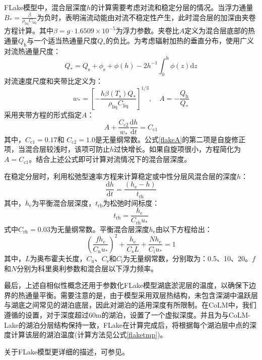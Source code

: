 FLake模型中，混合层深度$h$的计算需要考虑对流和稳定分层的情况。当浮力通量$B_* = \frac{\beta}{\rho_{\mathrm{liq}} C_{\mathrm{liq}}}$为负时，表明湍流动能由对流不稳定性产生，此时混合层的加深由夹卷方程计算。其中$\beta = g \cdot 1.6509 \times 10^{-5}$为浮力参数。夹卷比$A$定义为混合层底部的热通量$Q_{\mathrm{h}}$与一个适当热通量尺度$Q_*$的负比。为考虑辐射加热的垂直分布，使用广义对流热通量尺度：
\begin{equation}
    Q_* = Q_{\mathrm{s}} + \phi_{\mathrm{s}} + \phi(h) - 2h^{\mathrm{-1}} \int_{\mathrm{0}} ^ \mathrm{h} \phi(z) \mathrm{d} z
\end{equation}
对流速度尺度和夹带比定义为：
\begin{equation}\label{flakews}
    w_* = \left[-\frac{h \beta(T_{\mathrm{s}}) Q_*}{\rho_{\mathrm{liq}} C_{\mathrm{liq}}}\right]^{1/3}, \quad A = -\frac{Q_{\mathrm{h}}}{Q_*}
\end{equation}
采用夹带方程的形式指定$A$：
\begin{equation}\label{flakeA}
    A + \frac{C_{\mathrm{c2}}}{w_*} \frac{\mathrm{d} h}{\mathrm{d} t} = C_{\mathrm{c1}}
\end{equation}
其中，$C_{\mathrm{c1}} = 0.17$和 $C_{\mathrm{c2}} = 1.0$是无量纲常数。公式\eqref{flakeA}的第二项是自旋修正项，当混合层较浅时，该项可防止$h$过快增长。如果自旋项很小，方程简化为$A = C_{\mathrm{c1}}$。结合上述公式即可计算对流情况下的混合层深度。

在稳定分层时，利用松弛型速率方程来计算稳定或中性分层风混合层的深度$h$：
\begin{equation}
    \frac{\mathrm{d} h}{\mathrm{d} t} = \frac{(h_{\mathrm{e}} - h)}{t_{\mathrm{rh}}}
\end{equation}
其中，$h_{\mathrm{e}}$为平衡混合层深度，$t_{\mathrm{rh}}$为松弛时间标度：
\begin{equation}
    t_{\mathrm{rh}} = \frac{h_{\mathrm{e}}}{C_{\mathrm{rh}} u_*}
\end{equation}
式中$C_{\mathrm{rh}} = 0.03$为无量纲常数。平衡混合层深度$h_\mathrm{e}$由以下方程给出：
\begin{equation}
    \left( \frac{f h_{\mathrm{e}}}{C_{\mathrm{n}} u_*} \right)^2 + \frac{h_{\mathrm{e}}}{C_{\mathrm{s}} L} + \frac{N h_{\mathrm{e}}}{C_{\mathrm{i}} u_*} = 1
\end{equation}
其中，$L$为奥布霍夫长度，$C_{\mathrm{n}}$、$C_{\mathrm{s}}$和$C_{\mathrm{i}}$为无量纲常数，分别取为：0.5、10、20。$f$和$N$分别为科里奥利参数和混合层以下浮力频率。

最后，上述自相似性概念还用于参数化FLake模型湖底淤泥层的温度，以确保下边界的热通量平衡。需要注意的是，由于模型采用双层热结构，未包含深湖中温跃层与湖底之间常见的湖泊底层，因此对湖泊的适用深度有所限制。在CoLM中，我们遵循\citet{perroud2009simulation}的设置，对于深度超过60\unit{m}的湖泊，设置了一个虚拟深度。并且为与CoLM-Lake的湖泊分层结构保持一致，FLake在计算完成后，将根据每个湖泊层中点的深度计算该层的湖泊温度(计算方法见公式\eqref{flaketmp})。

关于FLake模型更详细的描述，可参见\citet{mironovCOSMOTechnicalReport2008a}。
